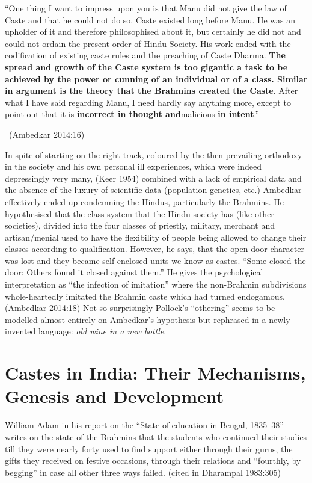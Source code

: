 \begin{myquote}
“One thing I want to impress upon you is that Manu did not give the law of Caste and that he could not do so. Caste existed long before Manu. He was an upholder of it and therefore philosophised about it, but certainly he did not and could not ordain the present order of Hindu Society. His work ended with the codification of existing caste rules and the preaching of Caste Dharma. \textbf{The spread and growth of the Caste system is too gigantic a task to be achieved by the power or cunning of an individual or of a class. Similar in argument is the theory that the Brahmins created the Caste}. After what I have said regarding Manu, I need hardly say anything more, except to point out that it is \textbf{incorrect in thought and}malicious \textbf{in intent}.” 

~\hfill (Ambedkar 2014:16)
\end{myquote}

In spite of starting on the right track, coloured by the then prevailing orthodoxy in the society and his own personal ill experiences, which were indeed depressingly very many, (Keer 1954) combined with a lack of empirical data and the absence of the luxury of scientific data (population genetics, etc.) Ambedkar effectively ended up condemning the Hindus, particularly the Brahmins. He hypothesised that the class system that the Hindu society has (like other societies), divided into the four classes of priestly, military, merchant and artisan/menial used to have the flexibility of people being allowed to change their classes according to qualification. However, he says, that the open-door character was lost and they became self-enclosed units we know as castes. “Some closed the door: Others found it closed against them.” He gives the psychological interpretation as “the infection of imitation” where the non-Brahmin subdivisions whole-heartedly imitated the Brahmin caste which had turned endogamous. (Ambedkar 2014:18) Not so surprisingly Pollock's “othering” seems to be modelled almost entirely on Ambedkar's hypothesis but rephrased in a newly invented language: \textit{old wine in a new bottle}.

\newpage

\section*{Castes in India: Their Mechanisms, Genesis and Development}

William Adam in his report on the “State of education in Bengal, 1835–38” writes on the state of the Brahmins that the students who continued their studies till they were nearly forty used to find support either through their gurus, the gifts they received on festive occasions, through their relations and “fourthly, by begging” in case all other three ways failed. (cited in Dharampal 1983:305)

